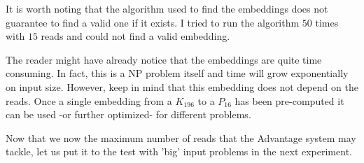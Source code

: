 \begin{table}[H]
	\centering
	\caption{Results of experiment 4}
	\label{tab:exp4}
\end{table}

It is worth noting that the algorithm used to find the embeddings does not guarantee to find a valid one if it exists. I tried to run the algorithm $50$ times with $15$ reads and could not find a valid embedding.

The reader might have already notice that the embeddings are quite time consuming. In fact, this is a NP problem itself and time will grow exponentially on input size. However, keep in mind that this embedding does not depend on the reads. Once a single embedding from a $K_{196}$ to a $P_{16}$ has been pre-computed it can be used -or further optimized- for different problems.

Now that we now the maximum number of reads that the Advantage system may tackle, let us put it to the test with 'big' input problems in the next experiment.



